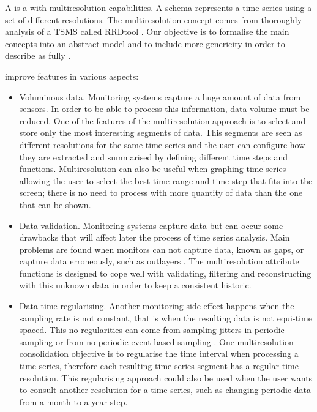 A  is a  with multiresolution capabilities.  A
 schema represents a time series using a set of different
resolutions.  The multiresolution concept comes from thoroughly
analysis of a TSMS called RRDtool \cite{rrdtool}. Our objective is to
formalise the main concepts into an abstract model and to include more
genericity in order to describe  as fully .



 improve  features in various aspects:
\begin{itemize}

\item Voluminous data. Monitoring systems capture a huge amount of
  data from sensors. In order to be able to process this information,
  data volume must be reduced. One of the features of the
  multiresolution approach is to select and store only the most
  interesting segments of data. This segments are seen as different
  resolutions for the same time series and the user can configure how
  they are extracted and summarised by defining different time steps
  and functions. Multiresolution can also be useful when graphing time
  series allowing the user to select the best time range and time
  step that fits into the screen; there is no need to process with
  more quantity of data than the one that can be
  shown.%

\item Data validation. Monitoring systems capture data but can occur
  some drawbacks that will affect later the process of time series
  analysis. Main problems are found when monitors can not capture
  data, known as gaps, or capture data erroneously, such as outlayers
  \cite{quevedo10}.  The multiresolution attribute functions is
  designed to cope well with validating, filtering and reconstructing
  with this unknown data in order to keep a consistent
  historic.%

\item Data time regularising. Another monitoring side effect happens
  when the sampling rate is not constant, that is when the resulting
  data is not equi-time spaced. This no regularities can come from
  sampling jitters in periodic sampling or from no periodic
  event-based sampling \cite{kopetz11:realtime}. One multiresolution
  consolidation objective is to regularise the time interval when
  processing a time series, therefore each resulting time series
  segment has a regular time resolution. This regularising approach
  could also be used when the user wants to consult another resolution
  for a time series, such as changing periodic data from a month to a
  year step. %


\end{itemize}
